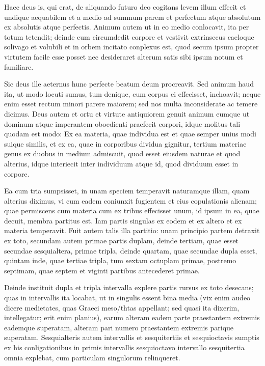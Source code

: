  Haec deus is, qui erat, de aliquando futuro deo cogitans levem illum effecit et undique aequabilem et a medio ad summum parem et perfectum atque absolutum ex absolutis atque perfectis. Animum autem ut in eo medio conlocavit, ita per totum tetendit; deinde eum circumdedit corpore et vestivit extrinsecus caeloque solivago et volubili et in orbem incitato conplexus est, quod secum ipsum propter virtutem facile esse posset nec desideraret alterum satis sibi ipsum notum et familiare.

 Sic deus ille aeternus hunc perfecte beatum deum procreavit. Sed animum haud ita, ut modo locuti sumus, tum denique, cum corpus ei effecisset, inchoavit; neque enim esset rectum minori parere maiorem; sed nos multa inconsiderate ac temere dicimus. Deus autem et ortu et virtute antiquiorem genuit animum eumque ut dominum atque imperantem oboedienti praefecit corpori, idque molitus tali quodam est modo: Ex ea materia, quae individua est et quae semper unius modi suique similis, et ex ea, quae in corporibus dividua gignitur, tertium materiae genus ex duobus in medium admiscuit, quod esset eiusdem naturae et quod alterius, idque interiecit inter individuum atque id, quod dividuum esset in corpore.

 Ea cum tria sumpsisset, in unam speciem temperavit naturamque illam, quam alterius diximus, vi cum eadem coniunxit fugientem et eius copulationis alienam; quae permiscens cum materia cum ex tribus effecisset unum, id ipsum in ea, quae decuit, membra partitus est. Iam partis singulas ex eodem et ex altero et ex materia temperavit. Fuit autem talis illa partitio: unam principio partem detraxit ex toto, secundam autem primae partis duplam, deinde tertiam, quae esset secundae sesquialtera, primae tripla, deinde quartam, quae secundae dupla esset, quintam inde, quae tertiae tripla, tum sextam octuplam primae, postremo septimam, quae septem et viginti partibus antecederet primae.

 Deinde instituit dupla et tripla intervalla explere partis rursus ex toto desecans; quas in intervallis ita locabat, ut in singulis essent bina media (vix enim audeo dicere medietates, quas Graeci meso/thtas appellant; sed quasi ita dixerim, intellegatur; erit enim planius), earum alteram eadem parte praestantem extremis eademque superatam, alteram pari numero praestantem extremis parique superatam. Sesquialteris autem intervallis et sesquitertiis et sesquioctavis sumptis ex his conligationibus in primis intervallis sesquioctavo intervallo sesquitertia omnia explebat, cum particulam singulorum relinqueret.

